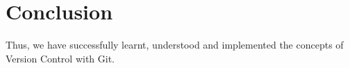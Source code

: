 \documentclass[11pt]{article}
\begin{document}



% 

\section{Conclusion}
Thus, we have successfully learnt, understood and implemented the concepts of Version Control with Git.
\clearpage
\end{document}
